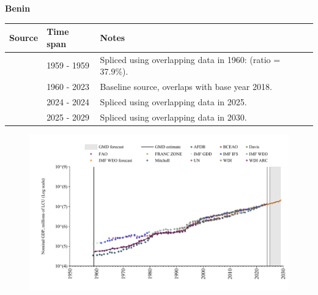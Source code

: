 \documentclass[12pt,a4paper,landscape]{article}
\begin{document}
\begin{adjustbox}{max totalsize={\paperwidth}{\paperheight},center}
\begin{minipage}[t][\textheight][t]{\textwidth}
\vspace*{0.5cm}
{}
\begin{center}
{\Large\bfseries Benin}
\end{center}
\vspace{0.5cm}
\begin{table}[H]
\centering
\small
\begin{tabular}{|l|l|l|}
\hline
\textbf{Source} & \textbf{Time span} & \textbf{Notes} \\
\hline
\rowcolor{white}\cite{IMF_GDD}& 1959 - 1959 &Spliced using overlapping data in 1960: (ratio = 37.9\%).\\
\rowcolor{lightgray}\cite{WDI}& 1960 - 2023 &Baseline source, overlaps with base year 2018.\\
\rowcolor{white}\cite{BCEAO}& 2024 - 2024 &Spliced using overlapping data in 2025.\\
\rowcolor{lightgray}\cite{IMF_WEO_forecast}& 2025 - 2029 &Spliced using overlapping data in 2030.\\
\hline
\end{tabular}
\end{table}
\begin{figure}[H]
\centering
\includegraphics[width=\textwidth,height=0.6\textheight,keepaspectratio]{graphs/BEN_nGDP.pdf}
\end{figure}
\end{minipage}
\end{adjustbox}
\end{document}
